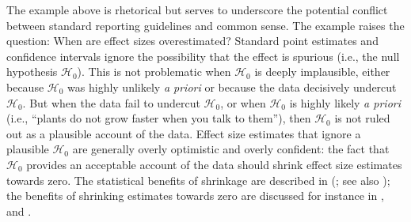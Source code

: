 \documentclass[a4paper]{article}
\newcommand{\EJ}[1]{\todo[inline, color=green]{  #1 }}
\newcommand{\DON}[1]{\todo[inline, color=white]{Don: #1}}
\newenvironment{revision}{\color{black}}{\color{black}}
\begin{document}
\begin{revision}%
The example above is rhetorical but serves to underscore the potential conflict between standard reporting guidelines and common sense. The example raises the question: When are effect sizes overestimated?
\end{revision}%
Standard point estimates and confidence intervals ignore the possibility that the effect is spurious (i.e., the null hypothesis $\mathcal{H}_0$). This is not problematic when $\mathcal{H}_0$ is deeply implausible, either because $\mathcal{H}_0$ was highly unlikely \emph{a priori} or because the data decisively undercut $\mathcal{H}_0$. But when the data fail to undercut $\mathcal{H}_0$, or when $\mathcal{H}_0$ is highly likely \emph{a priori} (i.e., ``plants do not grow faster when you talk to them''), then $\mathcal{H}_0$ is not ruled out as a plausible account of the data. Effect size estimates that ignore a plausible $\mathcal{H}_0$ are generally \begin{revision}overly optimistic and overly confident:\end{revision} the fact that $\mathcal{H}_0$ provides an acceptable account of the data should shrink effect size estimates towards zero.
\begin{revision}%
The statistical benefits of shrinkage are described in \citeauthor{EfronMorris1977} (\citeyear{EfronMorris1977}; see also \cite{davis2018estimation, RouderLu2005, ShiffrinEtAl2008}); the benefits of shrinking estimates towards zero are discussed for instance in \textcite{IversonEtAl2010, george1993variable}, and \textcite{vanErp2019shrinkage}.
\end{revision}
\end{document}

